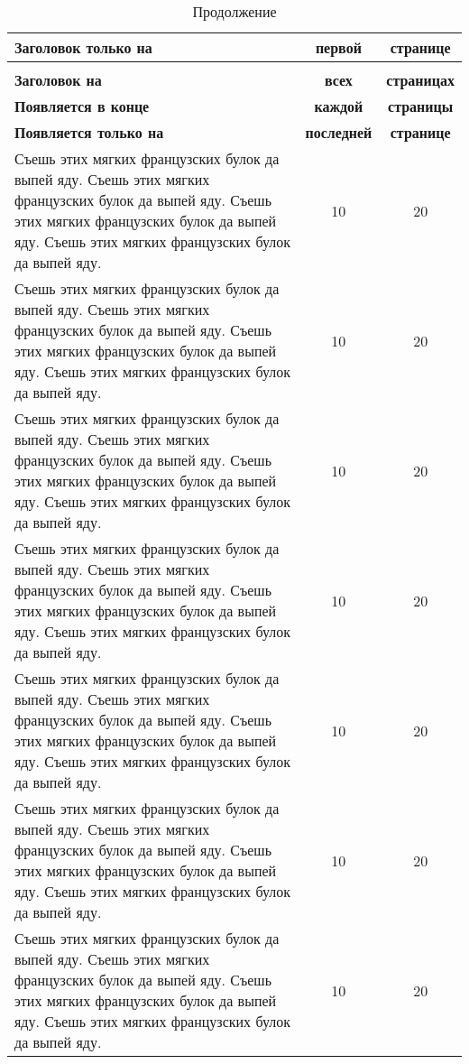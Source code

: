 \documentclass{./../class/UIR}
\begin{document}
\begin{longtable}{|p{10cm}|c|c|}
\caption[Первая часть!!!]{Заголовок самой интересной таблицы в
документе}\label{tab:bu}\\
\hline
\textbf{Заголовок только на} & \textbf{первой} & \textbf{странице} \\
\endfirsthead
\caption[]{Продолжение}\\
\hline
\textbf{Заголовок на} & \textbf{всех} & \textbf{страницах} \\
\endhead
\textbf{Появляется в конце} & \textbf{каждой} & \textbf{страницы} \\
\hline
\endfoot
\textbf{Появляется только на} & \textbf{последней} & \textbf{странице} \\
\hline
\endlastfoot
\hline
Съешь этих мягких французских булок да выпей яду. Съешь этих мягких французских булок да выпей яду. Съешь этих мягких французских булок да выпей яду. Съешь этих мягких французских булок да выпей яду. & 10 & 20 \\
\hline
Съешь этих мягких французских булок да выпей яду. Съешь этих мягких французских булок да выпей яду. Съешь этих мягких французских булок да выпей яду. Съешь этих мягких французских булок да выпей яду. & 10 & 20 \\
\hline
Съешь этих мягких французских булок да выпей яду. Съешь этих мягких французских булок да выпей яду. Съешь этих мягких французских булок да выпей яду. Съешь этих мягких французских булок да выпей яду. & 10 & 20 \\
\hline
Съешь этих мягких французских булок да выпей яду. Съешь этих мягких французских булок да выпей яду. Съешь этих мягких французских булок да выпей яду. Съешь этих мягких французских булок да выпей яду. & 10 & 20 \\
\hline
Съешь этих мягких французских булок да выпей яду. Съешь этих мягких французских булок да выпей яду. Съешь этих мягких французских булок да выпей яду. Съешь этих мягких французских булок да выпей яду. & 10 & 20 \\
\hline
Съешь этих мягких французских булок да выпей яду. Съешь этих мягких французских булок да выпей яду. Съешь этих мягких французских булок да выпей яду. Съешь этих мягких французских булок да выпей яду. & 10 & 20 \\
\hline
Съешь этих мягких французских булок да выпей яду. Съешь этих мягких французских булок да выпей яду. Съешь этих мягких французских булок да выпей яду. Съешь этих мягких французских булок да выпей яду. & 10 & 20 \\
\hline

\end{longtable}
\end{document}
